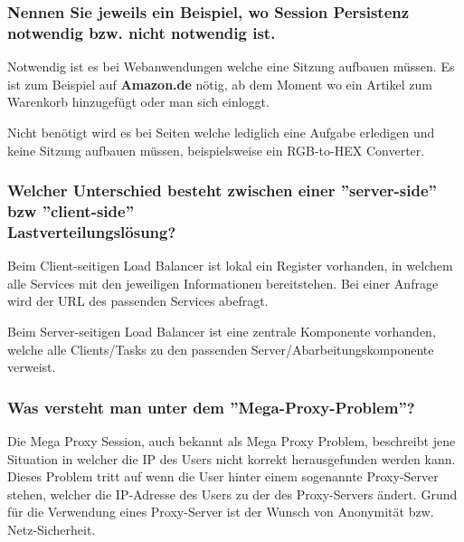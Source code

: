 \subsubsection{Nennen Sie jeweils ein Beispiel, wo Session Persistenz notwendig bzw. nicht notwendig ist.}
Notwendig ist es bei Webanwendungen welche eine Sitzung aufbauen müssen. Es ist zum Beispiel auf \textbf{Amazon.de} nötig, ab dem Moment wo ein Artikel zum Warenkorb hinzugefügt oder man sich einloggt.

Nicht benötigt wird es bei Seiten welche lediglich eine Aufgabe erledigen und keine Sitzung aufbauen müssen, beispielsweise ein RGB-to-HEX Converter.
\subsubsection{Welcher Unterschied besteht zwischen einer ''server-side'' bzw ''client-side''\\ Lastverteilungslösung?}
Beim Client-seitigen Load Balancer ist lokal ein Register vorhanden, in welchem alle Services mit den jeweiligen Informationen bereitstehen. Bei einer Anfrage wird der URL des passenden Services abefragt.

Beim Server-seitigen Load Balancer ist eine zentrale Komponente vorhanden, welche alle Clients/Tasks zu den passenden Server/Abarbeitungskomponente verweist. 
\subsubsection{Was versteht man unter dem ''Mega-Proxy-Problem''?}
Die Mega Proxy Session, auch bekannt als Mega Proxy Problem, beschreibt jene Situation in welcher die IP des Users nicht korrekt herausgefunden werden kann. Dieses Problem tritt auf wenn die User hinter einem sogenannte Proxy-Server stehen, welcher die IP-Adresse des Users zu der des Proxy-Servers ändert. Grund für die Verwendung eines Proxy-Server ist der Wunsch von Anonymität bzw. Netz-Sicherheit.
